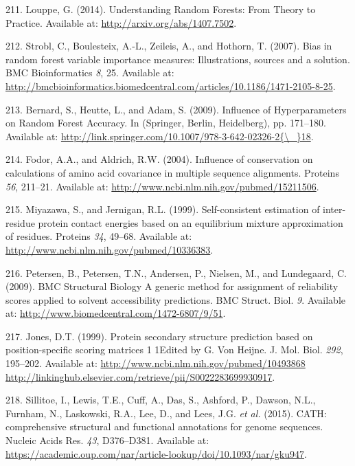 \documentclass[11pt,a4paper,twoside]{book}
\theoremstyle{definition}
\theoremstyle{definition}
\theoremstyle{remark}
\begin{document}
\hypertarget{ref-Louppe2014}{}
211. Louppe, G. (2014). Understanding Random Forests: From Theory to
Practice. Available at: \url{http://arxiv.org/abs/1407.7502}.

\hypertarget{ref-Strobl2007}{}
212. Strobl, C., Boulesteix, A.-L., Zeileis, A., and Hothorn, T. (2007).
Bias in random forest variable importance measures: Illustrations,
sources and a solution. BMC Bioinformatics \emph{8}, 25. Available at:
\url{http://bmcbioinformatics.biomedcentral.com/articles/10.1186/1471-2105-8-25}.

\hypertarget{ref-Bernard2009}{}
213. Bernard, S., Heutte, L., and Adam, S. (2009). Influence of
Hyperparameters on Random Forest Accuracy. In (Springer, Berlin,
Heidelberg), pp. 171--180. Available at:
\href{http://link.springer.com/10.1007/978-3-642-02326-2\%7B/_\%7D18}{http://link.springer.com/10.1007/978-3-642-02326-2\{\textbackslash{}\_\}18}.

\hypertarget{ref-Fodor2004a}{}
214. Fodor, A.A., and Aldrich, R.W. (2004). Influence of conservation on
calculations of amino acid covariance in multiple sequence alignments.
Proteins \emph{56}, 211--21. Available at:
\url{http://www.ncbi.nlm.nih.gov/pubmed/15211506}.

\hypertarget{ref-Miyazawa1999a}{}
215. Miyazawa, S., and Jernigan, R.L. (1999). Self-consistent estimation
of inter-residue protein contact energies based on an equilibrium
mixture approximation of residues. Proteins \emph{34}, 49--68. Available
at: \url{http://www.ncbi.nlm.nih.gov/pubmed/10336383}.

\hypertarget{ref-Petersen2009a}{}
216. Petersen, B., Petersen, T.N., Andersen, P., Nielsen, M., and
Lundegaard, C. (2009). BMC Structural Biology A generic method for
assignment of reliability scores applied to solvent accessibility
predictions. BMC Struct. Biol. \emph{9}. Available at:
\url{http://www.biomedcentral.com/1472-6807/9/51}.

\hypertarget{ref-Jones1999}{}
217. Jones, D.T. (1999). Protein secondary structure prediction based on
position-specific scoring matrices 1 1Edited by G. Von Heijne. J. Mol.
Biol. \emph{292}, 195--202. Available at:
\href{http://www.ncbi.nlm.nih.gov/pubmed/10493868\%20http://linkinghub.elsevier.com/retrieve/pii/S0022283699930917}{http://www.ncbi.nlm.nih.gov/pubmed/10493868 http://linkinghub.elsevier.com/retrieve/pii/S0022283699930917}.

\hypertarget{ref-Sillitoe2015}{}
218. Sillitoe, I., Lewis, T.E., Cuff, A., Das, S., Ashford, P., Dawson,
N.L., Furnham, N., Laskowski, R.A., Lee, D., and Lees, J.G. \emph{et
al.} (2015). CATH: comprehensive structural and functional annotations
for genome sequences. Nucleic Acids Res. \emph{43}, D376--D381.
Available at:
\url{https://academic.oup.com/nar/article-lookup/doi/10.1093/nar/gku947}.
\end{document}
